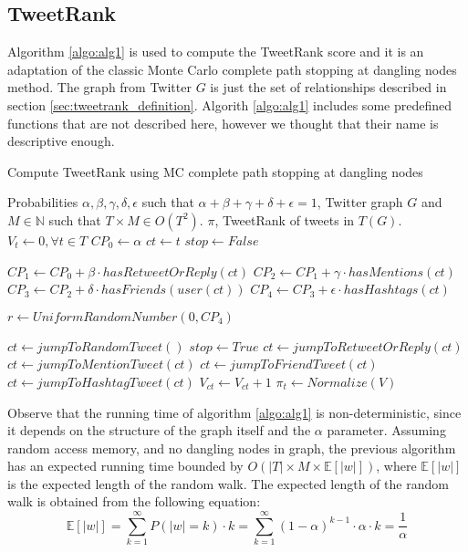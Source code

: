 \subsection{TweetRank}\label{sec:tweetrank_implementation}
Algorithm \ref{algo:alg1} is used to compute the TweetRank score and it is an adaptation of the classic Monte Carlo complete path stopping at dangling nodes method. The graph from Twitter $G$ is just the set of relationships described in section \ref{sec:tweetrank_definition}. Algorith \ref{algo:alg1} includes some predefined functions that are not described here, however we thought that their name is descriptive enough.

\begin{algorithm}
\caption{Compute TweetRank using MC complete path stopping at dangling nodes}
\label{algo:alg1}
{\fontsize{8}{8}\selectfont
\begin{algorithmic}
\REQUIRE Probabilities $\alpha, \beta, \gamma, \delta, \epsilon$ such that $\alpha+\beta+\gamma+\delta+\epsilon=1$, Twitter graph $G$ and $M \in \mathbb{N}$ such that $T\times M \in O(T^2)$.
\ENSURE $\pi$, TweetRank of tweets in $T(G)$.
\STATE $V_t \leftarrow 0, \forall t \in T$ 
\STATE $CP_0 \leftarrow \alpha$ 
\STATE $ct \leftarrow t$
\STATE $stop \leftarrow False$

\STATE $CP_1 \leftarrow CP_0 + \beta \cdot hasRetweetOrReply(ct)$
\STATE $CP_2 \leftarrow CP_1 + \gamma \cdot hasMentions(ct)$
\STATE $CP_3 \leftarrow CP_2 + \delta \cdot hasFriends(user(ct))$
\STATE $CP_4 \leftarrow CP_3 + \epsilon \cdot hasHashtags(ct)$

\STATE $r \leftarrow UniformRandomNumber(0, CP_4)$ 

\STATE $ct \leftarrow jumpToRandomTweet()$
\STATE $stop \leftarrow True$
\STATE $ct \leftarrow jumpToRetweetOrReply(ct)$
\STATE $ct \leftarrow jumpToMentionTweet(ct)$
\STATE $ct \leftarrow jumpToFriendTweet(ct)$
\ELSE
\STATE $ct \leftarrow jumpToHashtagTweet(ct)$
\ENDIF
\STATE $V_{ct} \leftarrow V_{ct} + 1$ 
\ENDWHILE
\ENDFOR
\ENDFOR
\STATE $\pi_t \leftarrow Normalize(V)$ 
\end{algorithmic}}
\end{algorithm}

Observe that the running time of algorithm \ref{algo:alg1} is non-deterministic, since it depends on the structure of the graph itself and the $\alpha$ parameter. Assuming random access memory, and no dangling nodes in graph, the previous algorithm has an expected running time bounded by $O(|T| \times M \times \mathbb{E}[|w|])$, where $\mathbb{E}[|w|]$ is the expected length of the random walk. The expected length of the random walk is obtained from the following
equation:
\begin{equation}
\mathbb{E}[|w|] = \sum_{k=1}^{\infty} P(|w| = k) \cdot k = \sum_{k=1}^{\infty} (1 - \alpha)^{k-1} \cdot \alpha \cdot k = \frac{1}{\alpha}
\end{equation}

